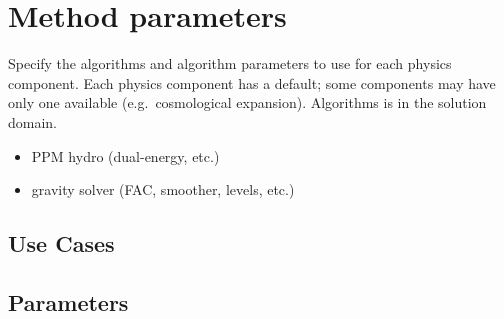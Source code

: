 \section{Method parameters} \label{s:method}

 Specify the algorithms and algorithm parameters
 to use for each physics component.  Each physics component has a
 default; some components may have only one available
 (e.g.~cosmological expansion).  Algorithms is in the solution domain.

\begin{itemize}
\item PPM hydro (dual-energy, etc.)
\item gravity solver (FAC, smoother, levels, etc.)
\end{itemize}

\subsection{Use Cases}
\subsection{Parameters}


